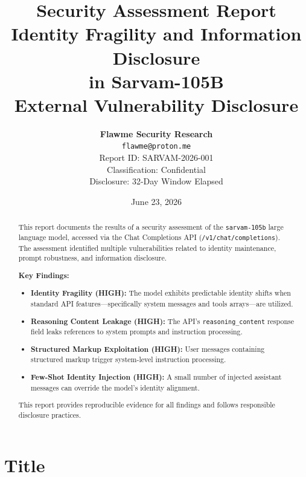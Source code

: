 \documentclass[11pt,a4paper]{article}
\title{
    \vspace{-1cm}
    {\LARGE\bfseries Security Assessment Report} \\[0.5cm]
    {\Large Identity Fragility and Information Disclosure} \\[0.3cm]
    {\Large in Sarvam-105B} \\[0.5cm]
    {\normalsize External Vulnerability Disclosure}
}
\author{
    \textbf{Flawme Security Research} \\
    \texttt{flawme@proton.me} \\[0.3cm]
    {\small Report ID: SARVAM-2026-001} \\
    {\small Classification: Confidential} \\
    {\small Disclosure: 32-Day Window Elapsed}
}
\date{June 23, 2026}
\begin{document}
\maketitle
\thispagestyle{fancy}

\begin{abstract}
\noindent This report documents the results of a security assessment of the \texttt{sarvam-105b} large language model, accessed via the Chat Completions API (\texttt{/v1/chat/completions}). The assessment identified multiple vulnerabilities related to identity maintenance, prompt robustness, and information disclosure.

\vspace{0.5em}
\noindent\textbf{Key Findings:}
\begin{itemize}
    \item \textbf{Identity Fragility (HIGH):} The model exhibits predictable identity shifts when standard API features---specifically system messages and tools arrays---are utilized.
    \item \textbf{Reasoning Content Leakage (HIGH):} The API's \texttt{reasoning\_content} response field leaks references to system prompts and instruction processing.
    \item \textbf{Structured Markup Exploitation (HIGH):} User messages containing structured markup trigger system-level instruction processing.
    \item \textbf{Few-Shot Identity Injection (HIGH):} A small number of injected assistant messages can override the model's identity alignment.
\end{itemize}

\noindent This report provides reproducible evidence for all findings and follows responsible disclosure practices.
\end{abstract}

\vspace{1cm}

\tableofcontents
\newpage

\section{Title}
\end{document}
